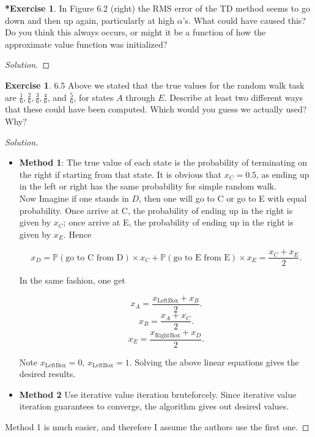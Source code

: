 \documentclass[oneside,11pt]{article}
\theoremstyle{definition}
\newtheorem{exer}[thm]{Exercise}
\newtheorem{exerstar}[thm]{*Exercise}
\newcommand{\PP}{\mathbb{P}}
\newenvironment{solution}
{\renewcommand\qedsymbol{$\blacksquare$}\begin{proof}[Solution]} {\end{proof}}
\begin{document}
\begin{exerstar}
 In Figure 6.2 (right) the RMS error of the TD method seems to go down and then up again, particularly at high $\alpha$'s. What could have caused this? Do you think this always occurs, or might it be a function of how the approximate value function was initialized?
\end{exerstar}

\begin{shaded}
\begin{solution} 


\end{solution} 
\end{shaded}

\begin{exer}
6.5 Above we stated that the true values for the random walk task are $\frac{1}{6}, \frac{2}{6}, \frac{3}{6}, \frac{4}{6}$, and $\frac{5}{6}$, for states $A$ through $E$. Describe at least two different ways that these could have been computed. Which would you guess we actually used? Why?
\end{exer}

\begin{shaded}
\begin{solution} 
~\\
\begin{itemize}
\item \textbf{Method 1}: The true value of each state is the probability of terminating on the right if starting from that state. It is obvious that $x_C = 0.5$, as ending up in the left or right has the same probability for simple random walk. \\

Now Imagine if one stands in $D$, then one will go to C or go to E with equal probability. Once arrive at C, the probability of ending up in the right is given by $x_C$; once arrive at E, the probability of ending up in the right is given by $x_E$. Hence 

\[x_D = \PP(\text{go to C from D}) \times x_C + \PP(\text{go to E from E}) \times  x_E = \frac{x_C + x_E}{2}.\]

In the same fashion, one get 

\[x_A = \frac{x_{\text{LeftBox}} + x_B}{2}. \]
\[x_B = \frac{x_{A} + x_C}{2}. \]
\[x_E = \frac{x_{\text{RightBox}} + x_D}{2}. \]

Note $x_{\text{LeftBox}} = 0$, $x_{\text{LeftBox}} = 1$. Solving the above linear equations gives the desired results.
\item \textbf{Method 2} Use iterative value iteration bruteforcely. Since iterative value iteration guarantees to converge, the algorithm gives out desired values.
\end{itemize}

Method 1 is much easier, and therefore I assume the authors use the first one.

\end{solution} 
\end{shaded}
\end{document}

